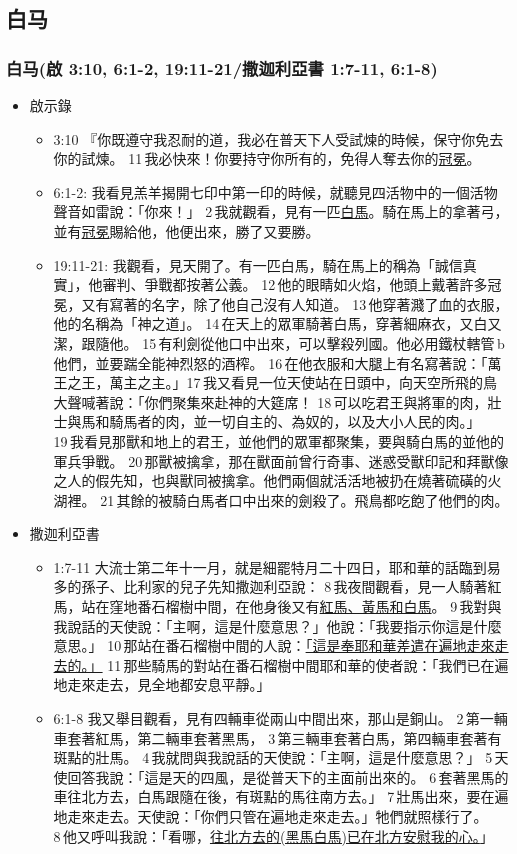 \subsection{白马}
\subsubsection{白马(啟 3:10, 6:1-2, 19:11-21/撒迦利亞書 1:7-11, 6:1-8)}
\begin{itemize}
\itemsep-.25em
\item 啟示錄
\begin{itemize}
\itemsep-.25em
\item 3:10 『你既遵守我忍耐的道，我必在普天下人受試煉的時候，保守你免去你的試煉。 11 我必快來！你要持守你所有的，免得人奪去你的\underline{冠冕}。
\item 6:1-2: 我看見羔羊揭開七印中第一印的時候，就聽見四活物中的一個活物聲音如雷說：「你來！」 2 我就觀看，見有一匹\underline{白馬}。騎在馬上的拿著弓，並有\underline{冠冕}賜給他，他便出來，勝了又要勝。
\item 19:11-21: 我觀看，見天開了。有一匹白馬，騎在馬上的稱為「誠信真實」，他審判、爭戰都按著公義。 12 他的眼睛如火焰，他頭上戴著許多冠冕，又有寫著的名字，除了他自己沒有人知道。 13 他穿著濺了血的衣服，他的名稱為「神之道」。 14 在天上的眾軍騎著白馬，穿著細麻衣，又白又潔，跟隨他。 15 有利劍從他口中出來，可以擊殺列國。他必用鐵杖轄管 b他們，並要踹全能神烈怒的酒榨。 16 在他衣服和大腿上有名寫著說：「萬王之王，萬主之主。」17 我又看見一位天使站在日頭中，向天空所飛的鳥大聲喊著說：「你們聚集來赴神的大筵席！ 18 可以吃君王與將軍的肉，壯士與馬和騎馬者的肉，並一切自主的、為奴的，以及大小人民的肉。」19 我看見那獸和地上的君王，並他們的眾軍都聚集，要與騎白馬的並他的軍兵爭戰。 20 那獸被擒拿，那在獸面前曾行奇事、迷惑受獸印記和拜獸像之人的假先知，也與獸同被擒拿。他們兩個就活活地被扔在燒著硫磺的火湖裡。 21 其餘的被騎白馬者口中出來的劍殺了。飛鳥都吃飽了他們的肉。
\end{itemize}
\item 撒迦利亞書
\begin{itemize}
\itemsep-.25em
\item 1:7-11 大流士第二年十一月，就是細罷特月二十四日，耶和華的話臨到易多的孫子、比利家的兒子先知撒迦利亞說： 8 我夜間觀看，見一人騎著紅馬，站在窪地番石榴樹中間，在他身後又有\underline{紅馬、黃馬和白馬}。 9 我對與我說話的天使說：「主啊，這是什麼意思？」他說：「我要指示你這是什麼意思。」 10 那站在番石榴樹中間的人說：\underline{「這是奉耶和華差遣在遍地走來走去的。」} 11 那些騎馬的對站在番石榴樹中間耶和華的使者說：「我們已在遍地走來走去，見全地都安息平靜。」
\item 6:1-8 我又舉目觀看，見有四輛車從兩山中間出來，那山是銅山。 2 第一輛車套著紅馬，第二輛車套著黑馬， 3 第三輛車套著白馬，第四輛車套著有斑點的壯馬。 4 我就問與我說話的天使說：「主啊，這是什麼意思？」 5 天使回答我說：「這是天的四風，是從普天下的主面前出來的。 6 套著黑馬的車往北方去，白馬跟隨在後，有斑點的馬往南方去。」 7 壯馬出來，要在遍地走來走去。天使說：「你們只管在遍地走來走去。」牠們就照樣行了。 8 他又呼叫我說：「看哪，\underline{往北方去的(黑馬白馬)已在北方安慰我的心。}」
\end{itemize}
\end{itemize}

